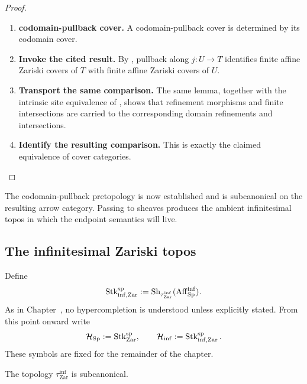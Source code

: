 \begin{proof}
\leavevmode
\begin{enumerate}[label=\textup{(\arabic*)}]
    \item \textbf{codomain-pullback cover.}
    A codomain-pullback cover is determined by its codomain cover.

    \item \textbf{Invoke the cited result.}
    By , pullback along \(j:U\to T\)
    identifies finite affine Zariski covers of \(T\) with finite affine Zariski covers of
    \(U\).

    \item \textbf{Transport the same comparison.}
    The same lemma, together with the intrinsic site equivalence of
    , shows that refinement morphisms and
    finite intersections are carried to the corresponding domain refinements and intersections.

    \item \textbf{Identify the resulting comparison.}
    This is exactly the claimed equivalence of cover categories.
\end{enumerate}
\end{proof}
The codomain-pullback pretopology is now established and is subcanonical on the
resulting arrow category. Passing to sheaves produces the ambient
infinitesimal topos in which the endpoint semantics will live.

\subsection{The infinitesimal Zariski topos}

\begin{definition}
\label{def:finite-infinitesimal-zariski-topos}
Define
\[
    \operatorname{Stk}^{\mathrm{sp}}_{\inf,\mathrm{Zar}}
    :=
    \operatorname{Sh}_{\tau^{\inf}_{\mathrm{Zar}}}
    (\operatorname{Aff}_{\operatorname{Sp}}^{\inf}).
\]
As in Chapter~, no hypercompletion is
understood unless explicitly stated. From this point onward write
\[
    \mathcal H_{\operatorname{Sp}}
    :=
    \operatorname{Stk}^{\mathrm{sp}}_{\mathrm{Zar}},
    \qquad
    \mathcal H_{\inf}
    :=
    \operatorname{Stk}^{\mathrm{sp}}_{\inf,\mathrm{Zar}}.
\]
These symbols are fixed for the remainder of the chapter.
\end{definition}

\begin{proposition}
\label{prop:infinitesimal-zariski-subcanonical}
The topology \(\tau^{\inf}_{\mathrm{Zar}}\) is subcanonical.
\end{proposition}

